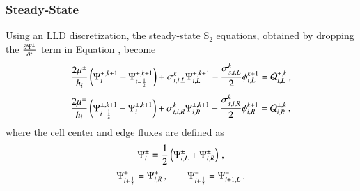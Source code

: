 \subsubsection{Steady-State}
Using an LLD discretization, the steady-state S$_2$ equations, obtained by
dropping the $\frac{\partial \Psi^\pm}{\partial t}$ term in Equation , become
\begin{equation}\lequ{S2ssL}
  \frac{2\mu^\pm}{h_i}\fn{\Psi^{\pm,k+1}_i - \Psi^{\pm,k+1}_{i-\half}}
  +\sigma_{t,i,L}^k\Psi\iL^{\pm,k+1}
  -\frac{\sigma_{s,i,L}^k}{2}\phi\iL^{k+1}
  =\Q_{i,L}^{\pm,k} \pec
\end{equation}
\begin{equation}\lequ{S2ssR}
  \frac{2\mu^\pm}{h_i}\fn{\Psi^{\pm,k+1}_{i+\half} - \Psi^{\pm,k+1}_i}
  +\sigma_{t,i,R}^k\Psi\iR^{\pm,k+1}
  -\frac{\sigma_{s,i,R}^k}{2}\phi\iR^{k+1}
  =\Q_{i,R}^{\pm,k} \pec
\end{equation}
where the cell center and edge fluxes are defined as
\begin{equation}
  \Psi_i^\pm=\frac{1}{2}\left( \Psi_{i,L}^\pm + \Psi_{i,R}^\pm \right) \, ,
\end{equation}
\begin{equation}
  \Psi_{i+\frac{1}{2}}^+=\Psi_{i,R}^+ \, ,\qquad \Psi_{i+\frac{1}{2}}^-=\Psi_{i+1,L}^- \, .
\end{equation}

